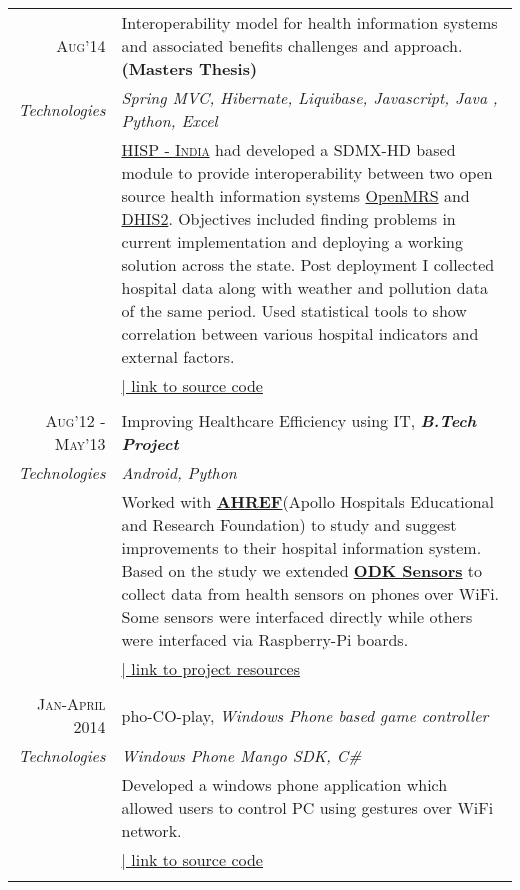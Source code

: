 \documentclass[a4paper,11pt]{article} %
\begin{document}
\begin{longtable}{r|p{15cm}}

\textsc{Aug'14} & Interoperability model for health information systems and associated benefits challenges and approach. \textbf{(Masters Thesis)}\\
\emph{Technologies} & \emph{Spring MVC, Hibernate, Liquibase, Javascript, Java , Python, Excel}\\ 
& \small{\href{http://hispindia.org/}{\textsc{HISP - India}} had developed a SDMX-HD based module to provide interoperability between two open source health information systems \href{http://openmrs.org/}{OpenMRS} and \href{https://www.dhis2.org/}{DHIS2}. Objectives included finding problems in current implementation and deploying a working solution across the state. Post deployment I collected hospital data along with weather and pollution data of the same period. Used statistical tools to show correlation between various hospital indicators and external factors.} \\ & \href{https://github.com/hispindia/dhisreport}{\hfill | link to source code}\\
\multicolumn{2}{c}{} \\


\textsc{Aug'12 - May'13} & Improving Healthcare Efficiency using IT, \emph\textbf{B.Tech Project}\\
\emph{Technologies} & \emph{Android, Python}\\ 
& \small{Worked with \href{http://www.aherf.org/}{\textbf{AHREF}}(Apollo Hospitals Educational and Research Foundation) to study and suggest improvements to their hospital information system. Based on the study we extended \href{https://opendatakit.org/use/sensors/}{\textbf{ODK Sensors}} to collect data from health sensors on phones over WiFi.  Some sensors were interfaced directly while others were interfaced via Raspberry-Pi boards.}\\ & \href{https://sites.google.com/a/iiitd.ac.in/apurvmehra/projects}{\hfill | link to project resources}\\
\multicolumn{2}{c}{} \\

\textsc{Jan-April 2014} & pho-CO-play, \emph{Windows Phone based game controller}\\
\emph{Technologies} & \emph{Windows Phone Mango SDK, C\# }\\ 
& \small{Developed a windows phone application which allowed users to control PC using gestures over WiFi network. }\\ & \href{https://github.com/am2990/pho-CO-play}{\hfill | link to source code}\\
\multicolumn{2}{c}{} \\


\end{longtable}
\end{document}
